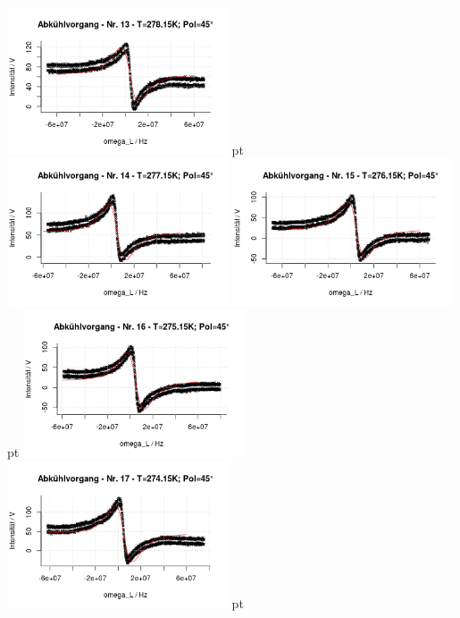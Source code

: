 \documentclass[12pt]{article}
\begin{document}
\begin{minipage}[h!]{\textwidth}
	{\centering
		\includegraphics[width=0.49\textwidth]{figures/cold45-13.png} pt
		\includegraphics[width=0.49\textwidth]{figures/cold45-14.png}\vskip -10pt	\includegraphics[width=0.49\textwidth]{figures/cold45-15.png} pt
		\includegraphics[width=0.49\textwidth]{figures/cold45-16.png}\vskip -10pt	\includegraphics[width=0.49\textwidth]{figures/cold45-17.png} pt
}
\end{minipage}
\end{document}
